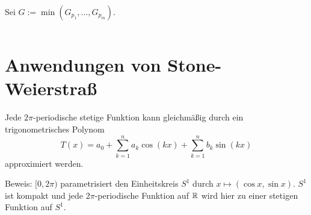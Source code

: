\begin{frame}
    \begin{columns}
        \begin{column}{0.4\textwidth}
            Sei \( G := \min(G_{p_1}, \ldots, G_{p_m}) \).

             


        \end{column}
        \begin{column}{0.6\textwidth}
        \end{column}
    \end{columns}
\end{frame}

\section*{Anwendungen von Stone-Weierstraß}

\begin{frame}
    \begin{kor}
        Jede \(2\pi\)-periodische stetige Funktion kann gleichmäßig durch ein trigonometrisches Polynom 
        \[ T(x) = a_0 + \sum_{k=1}^n a_k \cos(kx) + \sum_{k=1}^n b_k \sin(kx) \]
        approximiert werden.
    \end{kor}
    \pause
    Beweis:
    \( [0,2\pi) \) parametrisiert den Einheitskreis \(S^1\) durch \( x \mapsto (\cos x, \sin x) \). 
    \pause
    \(S^1\) ist kompakt und jede \(2\pi\)-periodische Funktion auf \(\mathbb{R}\) wird hier zu einer 
    stetigen Funktion auf \(S^1\).
\end{frame}

